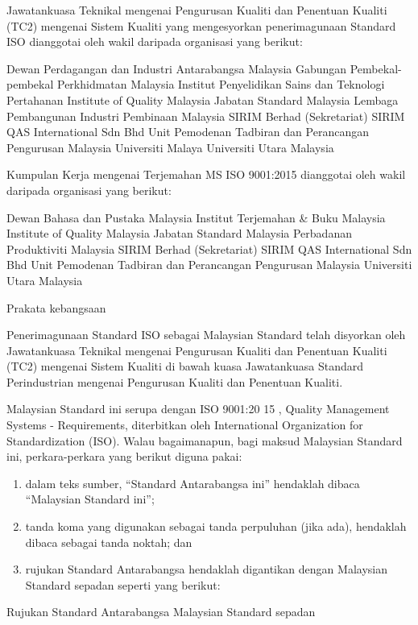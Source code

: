 \documentclass[
]{article}
\begin{document}
Jawatankuasa Teknikal mengenai Pengurusan Kualiti dan Penentuan Kualiti
(TC2) mengenai Sistem Kualiti yang mengesyorkan penerimagunaan Standard
ISO dianggotai oleh wakil daripada organisasi yang berikut:

Dewan Perdagangan dan Industri Antarabangsa Malaysia Gabungan
Pembekal-pembekal Perkhidmatan Malaysia Institut Penyelidikan Sains dan
Teknologi Pertahanan Institute of Quality Malaysia Jabatan Standard
Malaysia Lembaga Pembangunan Industri Pembinaan Malaysia SIRIM Berhad
(Sekretariat) SIRIM QAS International Sdn Bhd Unit Pemodenan Tadbiran
dan Perancangan Pengurusan Malaysia Universiti Malaya Universiti Utara
Malaysia

Kumpulan Kerja mengenai Terjemahan MS ISO 9001:2015 dianggotai oleh
wakil daripada organisasi yang berikut:

Dewan Bahasa dan Pustaka Malaysia Institut Terjemahan \& Buku Malaysia
Institute of Quality Malaysia Jabatan Standard Malaysia Perbadanan
Produktiviti Malaysia SIRIM Berhad (Sekretariat) SIRIM QAS International
Sdn Bhd Unit Pemodenan Tadbiran dan Perancangan Pengurusan Malaysia
Universiti Utara Malaysia

Prakata kebangsaan

Penerimagunaan Standard ISO sebagai Malaysian Standard telah disyorkan
oleh Jawatankuasa Teknikal mengenai Pengurusan Kualiti dan Penentuan
Kualiti (TC2) mengenai Sistem Kualiti di bawah kuasa Jawatankuasa
Standard Perindustrian mengenai Pengurusan Kualiti dan Penentuan
Kualiti.

Malaysian Standard ini serupa dengan ISO 9001:20 15 , Quality Management
Systems - Requirements, diterbitkan oleh International Organization for
Standardization (ISO). Walau bagaimanapun, bagi maksud Malaysian
Standard ini, perkara-perkara yang berikut diguna pakai:

\begin{enumerate}
\def\labelenumi{\alph{enumi})}
\item
  dalam teks sumber, ``Standard Antarabangsa ini'' hendaklah dibaca
  ``Malaysian Standard ini'';
\item
  tanda koma yang digunakan sebagai tanda perpuluhan (jika ada),
  hendaklah dibaca sebagai tanda noktah; dan
\item
  rujukan Standard Antarabangsa hendaklah digantikan dengan Malaysian
  Standard sepadan seperti yang berikut:
\end{enumerate}

Rujukan Standard Antarabangsa Malaysian Standard sepadan
\end{document}
